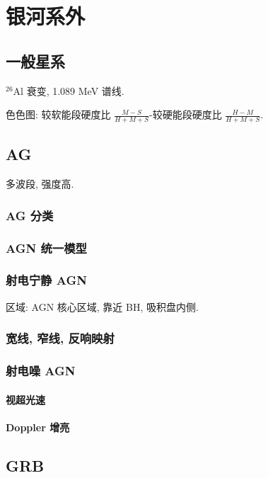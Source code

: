 \chapter{银河系外}

\section{一般星系}

${}^{26}$Al 衰变, 1.089 MeV 谱线.

色色图: 较软能段硬度比 $\frac{M-S}{H+M+S}$-较硬能段硬度比 $\frac{H-M}{H+M+S}$.

\section{AG}

多波段, 强度高.

\subsection{AG 分类}

\subsection{AGN 统一模型}

\subsection{射电宁静 AGN}

区域: AGN 核心区域, 靠近 BH, 吸积盘内侧.

\subsection{宽线, 窄线, 反响映射}

\subsection{射电噪 AGN}

\subsubsection{视超光速}

\subsubsection{Doppler 增亮}

\section{GRB}
